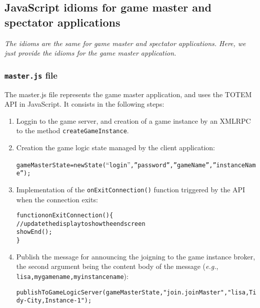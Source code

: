 
\subsection{JavaScript idioms for game master and spectator applications}
\label{SS_api_JavaScript}

\textit{The idioms are the same for game master and spectator applications. 
Here, we just provide the idioms for the game master application.}

\subsubsection{\texttt{master.js} file}

The master.js file represents the game master application, and uses
the TOTEM API in JavaScript. It consists in the following steps:

\begin{enumerate}

\item Loggin to the game server, and creation of a game instance by an 
XMLRPC to the method \texttt{createGameInstance}.
\item Creation the game logic state managed by the client application:
\begin{small}
\begin{alltt}
gameMasterState = new State(``login'',''password'',''gameName'',''instanceName'');
\end{alltt}
\end{small}
\item Implementation of the \texttt{onExitConnection()} function triggered by 
the API when the connection exits:
\begin{small}
\begin{alltt}
function onExitConnection()\{
  // update the display to show the end screen
  showEnd(); 
\}
\end{alltt}
\end{small}
\item Publish the message for announcing the joigning to
  the game instance broker, the second argument being the content body
  of the message (\emph{e.g.}, \texttt{lisa,mygamename,myinstancename}):
\begin{small}
\begin{alltt}
publishToGameLogicServer(gameMasterState, "join.joinMaster", "lisa,Tidy-City,Instance-1");
\end{alltt}
\end{small}
\end{enumerate}


